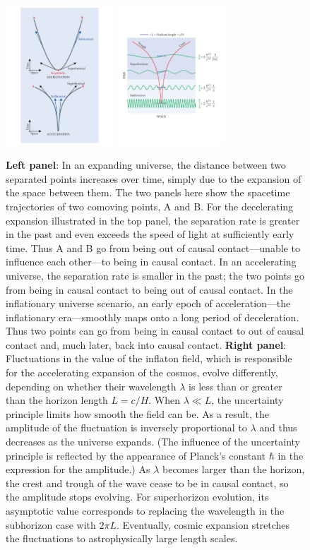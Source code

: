 \begin{figure}[ht]
\centering
\includegraphics[width=0.36\textwidth]{Inflation/CausalStructure.pdf}
\includegraphics[width=0.36\textwidth]{Inflation/QuantumFluctuations.pdf}
\caption{{\bf Left panel}: In an expanding universe, the distance between two separated points increases over time, simply due to the expansion of the space between them. The two panels here show the spacetime trajectories of two comoving points, A and B. For the decelerating expansion illustrated in the top panel, the separation rate is greater in the past and even exceeds the speed of light at sufficiently early time. Thus A and B go from being out of causal contact—unable to influence each other—to being in causal contact. In an accelerating universe, the separation rate is smaller in the past; the two points go from being in causal contact to being out of causal contact. In the inflationary universe scenario, an early epoch of acceleration—the inflationary era—smoothly maps onto a long period of deceleration. Thus two points can go from being in causal contact to out of causal contact and, much later, back into causal contact. {\bf Right panel}:
Fluctuations in the value of the inflaton field, which is responsible for the accelerating expansion of the cosmos, evolve differently, depending on whether their wavelength $\lambda$ is less than or greater than the horizon length $L = c/H$. When $\lambda \ll L$, the uncertainty principle limits how smooth the field can be. As a result, the amplitude of the fluctuation is inversely proportional to $\lambda$ and thus decreases as the universe expands. (The influence of the uncertainty principle is reflected by the appearance of Planck’s constant $\hbar$ in the expression for the amplitude.) As $\lambda$ becomes larger than the horizon, the crest and trough of the wave cease to be in causal contact, so the amplitude stops evolving. For superhorizon evolution, its asymptotic value corresponds to replacing the wavelength in the subhorizon case with $2\pi L$. Eventually, cosmic expansion stretches the fluctuations to astrophysically large length scales.
}
\end{figure}
